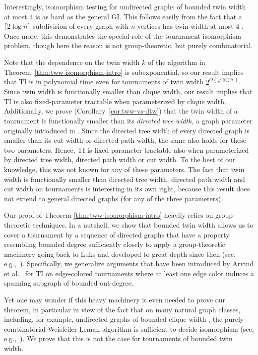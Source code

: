 \PassOptionsToPackage{dvipsnames,svgnames}{xcolor}\documentclass[10pt,a4paper]{article}
\begin{document}
Interestingly, isomorphism testing for undirected graphs of bounded twin width at most $4$ is as hard as the general GI.
This follows easily from the fact that a $\lceil 2\log n\rceil$-subdivision of every graph with $n$ vertices has twin width at most $4$ \cite{BergeBD22}.
Once more, this demonstrates the special role of the tournament isomorphism problem, though here the reason is not group-theoretic, but purely combinatorial.

Note that the dependence on the twin width $k$ of the algorithm in Theorem~\ref{thm:tww-isomorphism-intro} is subexponential, so our result implies that TI is in polynomial time even for tournaments of twin width $2^{O(\sqrt{\log n})}$.
Since twin width is functionally smaller than clique width, our result implies that TI is also fixed-parameter tractable when parameterized by clique width.
Additionally, we prove (Corollary~\ref{cor:tww-vs-dtw}) that the twin width of a tournament is functionally smaller than its \emph{directed tree width}, a graph parameter originally introduced in \cite{JohnsonRST01}.
Since the directed tree width of every directed graph is smaller than its cut width or directed path width, the same also holds for these two parameters.
Hence, TI is fixed-parameter tractable also when parameterized by directed tree width, directed path width or cut width.
To the best of our knowledge, this was not known for any of these parameters.
The fact that twin width is functionally smaller than directed tree width, directed path width and cut width on tournaments is interesting in its own right, because this result does not extend to general directed graphs (for any of the three parameters).

Our proof of Theorem \ref{thm:tww-isomorphism-intro} heavily relies on group-theoretic techniques.
In a nutshell, we show that bounded twin width allows us to cover a tournament by a sequence of directed graphs that have a property resembling bounded degree sufficiently closely to apply a group-theoretic machinery going back to Luks \cite{Luks82} and developed to great depth since then (see, e.g.,~\cite{Babai16,BabaiL83,GroheNS23,Miller83,Neuen22}).
Specifically, we generalize arguments that have been introduced by Arvind et al.~\cite{ArvindPR25} for TI on edge-colored tournaments where at least one edge color induces a spanning subgraph of bounded out-degree.

Yet one may wonder if this heavy machinery is even needed to prove our theorem, in particular in view of the fact that on many natural graph classes,
including, for example, undirected graphs of bounded clique width \cite{GroheN23}, the purely combinatorial Weisfeiler-Leman algorithm is sufficient to decide isomorphism (see, e.g.,~\cite{Grohe17,Kiefer20}).
We prove that this is not the case for tournaments of bounded twin width.
\end{document}
